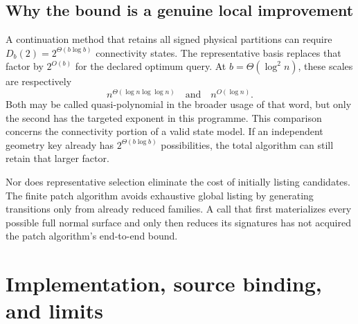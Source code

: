 \documentclass[11pt,letterpaper]{article}
\theoremstyle{definition}
\begin{document}
\subsection{Why the bound is a genuine local improvement}
A continuation method that retains all signed physical partitions can require $D_b(2)=2^{\Theta(b\log b)}$ connectivity states. The representative basis replaces that factor by $2^{O(b)}$ for the declared optimum query. At $b=\Theta(\log^2 n)$, these scales are respectively
\[
 n^{\Theta(\log n\log\log n)}\quad\text{and}\quad n^{O(\log n)}.
\]
Both may be called quasi-polynomial in the broader usage of that word, but only the second has the targeted exponent in this programme. This comparison concerns the connectivity portion of a valid state model. If an independent geometry key already has $2^{\Theta(b\log b)}$ possibilities, the total algorithm can still retain that larger factor.

Nor does representative selection eliminate the cost of initially listing candidates. The finite patch algorithm avoids exhaustive global listing by generating transitions only from already reduced families. A call that first materializes every possible full normal surface and only then reduces its signatures has not acquired the patch algorithm's end-to-end bound.

\section{Implementation, source binding, and limits}
\label{sec:integration}
\end{document}
